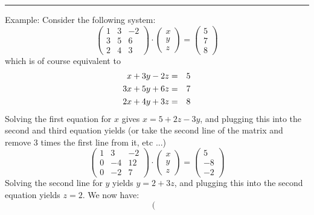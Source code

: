 \begin{center}
\begin{minipage}[t]{0.77\textwidth}
\par\noindent\rule{\textwidth}{0.4pt}
{\color{blue} Example}:
Consider the following system:
\begin{equation}
\left(
\begin{array}{ccc}
1 & 3 & -2 \\
3 & 5 & 6 \\
2 & 4 & 3
\end{array}
\right)
\cdot
\left(
\begin{array}{c}
x \\ y \\ z
\end{array}
\right)
=
\left(
\begin{array}{c}
5 \\ 7 \\ 8
\end{array}
\right)
\end{equation}
which is of course equivalent to
\begin{eqnarray}
x+3y-2z &=& 5 \nonumber\\
3x+5y+6z &=& 7 \nonumber\\
2x+4y+3z &=& 8 
\end{eqnarray}
Solving the first equation for $x$ gives $x = 5 + 2z - 3y$, 
and plugging this into the second and third equation yields
(or take the second line of the matrix and remove 3 times the 
first line from it, etc ...)
\begin{equation}
\left(
\begin{array}{ccc}
1 & 3 & -2 \\
0 & -4 & 12 \\
0 & -2 & 7
\end{array}
\right)
\cdot
\left(
\begin{array}{c}
x \\ y \\ z
\end{array}
\right)
=
\left(
\begin{array}{c}
5 \\ -8 \\ -2 
\end{array}
\right)
\end{equation}
Solving the second line for $y$ yields $y = 2 + 3z$, 
and plugging this into the second equation yields $z = 2$. We now have: 
\begin{equation}
\left(
\begin{array}{ccc}

\end{array}
\end{equation}
\end{minipage}
\end{center}
